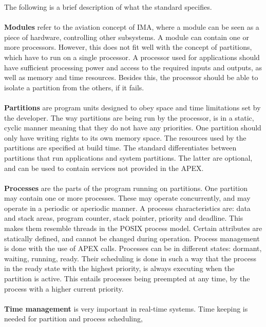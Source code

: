 The following is a brief description of what the standard specifies.
\\\\
\textbf{Modules}
refer to the aviation concept of IMA, where a module
can be seen as a piece of hardware, controlling other subsystems.
A module can contain one or more processors. However, this does not fit 
well with the concept of partitions,
which have to run on a single processor\cite{arinc_page_11}.
A processor used for \arinc{} applications should have sufficient processing
power and access to the required inputs and outputs,
as well as memory and time resources.
Besides this, the processor should be able to isolate a partition from
the others, if it fails\cite{arinc_page_12}.
\\\\
\textbf{Partitions}
are program units designed to obey space and time limitations
set by the developer. The way partitions are being run by the processor,
is in a static, cyclic manner meaning that they do not have any priorities.
One partition should only have writing rights to its own memory space\cite{arinc_page_13}.
The resources used by the partitions are specified at build time\cite{arinc_page_14}.
The standard differentiates between partitions that run applications and system partitions. The latter are optional, and can be used to contain
services not provided in the APEX\cite{arinc_scarlett}.
\\\\
\textbf{Processes}
are the parts of the program running on partitions. One partition
may contain one or more processes. These may operate concurrently,
and may operate in a periodic or aperiodic manner.
A process\textquotesingle s
characteristics are: data and stack areas, program counter, stack pointer,
priority and deadline. This makes them resemble threads in the POSIX\cite{posix} process model.
Certain attributes are statically defined, and cannot
be changed during operation\cite{arinc_page_19}.
Process management is done with the use of APEX calls.
Processes can be in different states: dormant, waiting, running, ready.
Their scheduling is done in such a way that the process in the ready state
with the highest priority, is always executing when the partition is active.
This entails processes being preempted at any time, by the process with a
higher current priority\cite{arinc_page_20}.
\\\\
\textbf{Time management}
is very important in real-time systems.
Time keeping is needed for partition and process scheduling,
